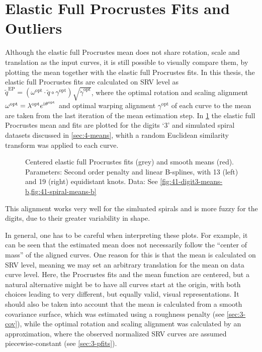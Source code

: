 \section{Elastic Full Procrustes Fits and Outliers}
\label{sec:4-pfits}
Although the elastic full Procrustes mean does not share rotation, scale and translation as the input curves, it is still possible to visually compare them, by plotting the mean together with the elastic full Procrustes fits.
In this thesis, the elastic full Procrustes fits are calculated on SRV level as $\widetilde q^\mathrm{EP} = (\omega^\mathrm{opt}\cdot \widetilde q \circ \gamma^\mathrm{opt} ) \sqrt{\dot\gamma^\mathrm{opt}}$, where the optimal rotation and scaling alignment $\omega^\mathrm{opt} = \lambda^\mathrm{opt} e^{\mathrm{i}\mkern1mu \theta^\mathrm{opt}}$ and optimal warping alignment $\gamma^\mathrm{opt}$ of each curve to the mean are taken from the last iteration of the mean estimation step.
In \cref{fig:4-pfits} the elastic full Procrustes mean and fits are plotted for the digits \enquote*{3} and simulated spiral datasets discussed in \cref{sec:4-means}, whith a random Euclidean similarity transform was applied to each curve.
\begin{figure}
  \centering
  \begin{subfigure}{0.48\textwidth}
  \end{subfigure}
  \begin{subfigure}{0.48\textwidth}
  \end{subfigure}
  \caption{Centered elastic full Procrustes fits (grey) and smooth means (red). Parameters: Second order penalty and linear B-splines, with 13 (left) and 19 (right) equidistant knots. Data: See \cref{fig:41-digit3-means-b,fig:41-spiral-means-b}}
  \label{fig:4-pfits}
\end{figure}
This alignment works very well for the simluated spirals and is more fuzzy for the digits, due to their greater variability in shape. 

In general, one has to be careful when interpreting these plots.
For example, it can be seen that the estimated mean does not necessarily follow the \enquote{center of mass} of the aligned curves. 
One reason for this is that the mean is calculated on SRV level, meaning we may set an arbitrary translation for the mean on data curve level.
Here, the Procrustes fits and the mean function are centered, but a natural alternative might be to have all curves start at the origin, with both choices leading to very different, but equally valid, visual representations.
It should also be taken into account that the mean is calculated from a smooth covariance surface, which was estimated using a roughness penalty (see \cref{sec:3-cov}), while the optimal rotation and scaling alignment was calculated by an approximation, where the observed normalized SRV curves are assumed piecewise-constant (see \cref{sec:3-pfits}).

